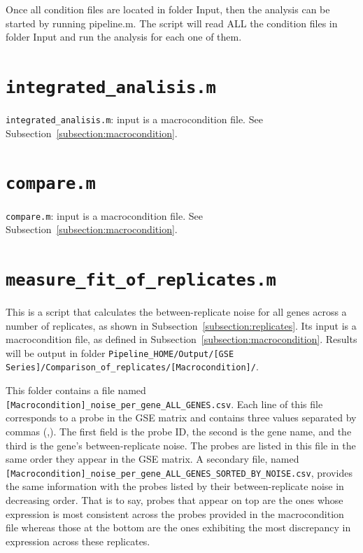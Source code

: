 \documentclass[final,letterpaper,twoside,12pt]{article}
\begin{document}
\fi

\par Once all condition files are located in folder Input, then the analysis can be started by running pipeline.m. The script will read ALL the condition files in folder Input and run the analysis for each one of them.

\section{\texttt{integrated\_analisis.m}}

\par \texttt{integrated\_analisis.m}: input is a macrocondition file. See Subsection~\ref{subsection:macrocondition}.

\section{\texttt{compare.m}}

\par \texttt{compare.m}: input is a macrocondition file. See Subsection~\ref{subsection:macrocondition}.

\section{\texttt{measure\_fit\_of\_replicates.m}}
\label{section:between_replicate_noise_m}

\par This is a script that calculates the between-replicate noise for all genes across a number of replicates, as shown in Subsection~\ref{subsection:replicates}. Its input is a macrocondition file, as defined in Subsection~\ref{subsection:macrocondition}. Results will be output in folder \texttt{Pipeline\_HOME/Output/[GSE Series]/Comparison\_of\_replicates/[Macrocondition]/}.

\par This folder contains a file named \texttt{[Macrocondition]\_noise\_per\_gene\_ALL\_GENES.csv}. Each line of this file corresponds to a probe in the GSE matrix and contains three values separated by commas (,). The first field is the probe ID, the second is the gene name, and the third is the gene's between-replicate noise. The probes are listed in this file in the same order they appear in the GSE matrix. A secondary file, named \texttt{[Macrocondition]\_noise\_per\_gene\_ALL\_GENES\_SORTED\_BY\_NOISE.csv}, provides the same information with the probes listed by their between-replicate noise in decreasing order. That is to say, probes that appear on top are the ones whose expression is most consistent across the probes provided in the macrocondition file whereas those at the bottom are the ones exhibiting the most discrepancy in expression across these replicates.





\end{document}
